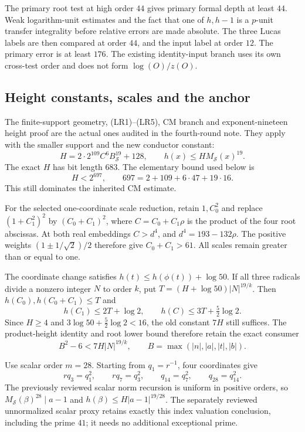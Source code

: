 The primary root test at high order $44$ gives primary formal depth
at least $44$. Weak logarithm-unit estimates and the fact that one of
$h,h-1$ is a $p$-unit transfer integrality before relative errors are
made absolute. The three Lucas labels are then compared at order $44$,
and the input label at order $12$. The primary error is at least $176$.
The existing identity-input branch uses its own cross-test order and
does not form $\log(O)/z(O)$.

\subsection{Height constants, scales and the anchor}

The finite-support geometry, (LR1)--(LR5), CM branch and exponent-nineteen
height proof are the actual ones audited in the fourth-round note.
They apply with the smaller support and the new conductor constant:
\[
 H=2\cdot2^{109}C^6B_{\mathcal S}^{19}+128,
 \qquad h(x)\le H M_{\mathcal S}(x)^{19}.
\]
The exact $H$ has bit length $683$. The elementary bound used below is
\[
 H<2^{697},\qquad697=2+109+6\cdot47+19\cdot16.
\]
This still dominates the inherited CM estimate.

For the selected one-coordinate scale reduction, retain $1,C_0^2$ and
replace $(1+C_1^2)^2$ by $(C_0+C_1)^2$, where
$C=C_0+C_1\rho$ is the product of the four root abscissas.
At both real embeddings $C>d^4$, and $d^4=193-132\rho$.
The positive weights $(1\pm1/\sqrt2)/2$ therefore give $C_0+C_1>61$.
All scales remain greater than or equal to one.

The coordinate change satisfies $h(t)\le h(\phi(t))+\log50$.
If all three radicals divide a nonzero integer $N$ to order $k$, put
$T=(H+\log50)|N|^{19/k}$. Then $h(C_0),h(C_0+C_1)\le T$ and
\[
 h(C_1)\le2T+\log2,\qquad h(C)\le3T+\tfrac52\log2.
\]
Since $H\ge4$ and $3\log50+\tfrac52\log2<16$, the old constant
$7H$ still suffices. The product-height identity and root lower bound
therefore retain the exact consumer
\[
 B^2-6<7H|N|^{19/k},\qquad B=\max(|n|,|a|,|t|,|b|).
\]

Use scalar order $m=28$. Starting from $q_1=r^{-1}$, four coordinates
give
\[
 rq_3=q_1^2,\qquad rq_7=q_3^2,\qquad
 q_{14}=q_7^2,\qquad q_{28}=q_{14}^2.
\]
The previously reviewed scalar norm recursion is uniform in positive
orders, so $M_{\mathcal S}(\beta)^{28}\mid a-1$ and
$h(\beta)\le H|a-1|^{19/28}$. The separately reviewed unnormalized
scalar proxy retains exactly this index valuation conclusion, including
the prime $41$; it needs no additional exceptional prime.

